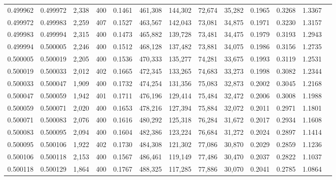 \begin{tabular}{rrrrrrrrrrrrr}
0.499962 & 0.499972 & 2,338 & 400 &                                     0.1461 & 461,308 & 144,302 &  72,674 &  35,282 & 0.1965 & 0.3268 & 1.3367 \\
0.499972 & 0.499983 & 2,259 & 407 &                                     0.1527 & 463,567 & 142,043 &  73,081 &  34,875 & 0.1971 & 0.3230 & 1.3157 \\
0.499983 & 0.499994 & 2,315 & 400 &                                     0.1473 & 465,882 & 139,728 &  73,481 &  34,475 & 0.1979 & 0.3193 & 1.2943 \\
0.499994 & 0.500005 & 2,246 & 400 &                                     0.1512 & 468,128 & 137,482 &  73,881 &  34,075 & 0.1986 & 0.3156 & 1.2735 \\
0.500005 & 0.500019 & 2,205 & 400 &                                     0.1536 & 470,333 & 135,277 &  74,281 &  33,675 & 0.1993 & 0.3119 & 1.2531 \\
0.500019 & 0.500033 & 2,012 & 402 &                                     0.1665 & 472,345 & 133,265 &  74,683 &  33,273 & 0.1998 & 0.3082 & 1.2344 \\
0.500033 & 0.500047 & 1,909 & 400 &                                     0.1732 & 474,254 & 131,356 &  75,083 &  32,873 & 0.2002 & 0.3045 & 1.2168 \\
0.500047 & 0.500059 & 1,942 & 401 &                                     0.1711 & 476,196 & 129,414 &  75,484 &  32,472 & 0.2006 & 0.3008 & 1.1988 \\
0.500059 & 0.500071 & 2,020 & 400 &                                     0.1653 & 478,216 & 127,394 &  75,884 &  32,072 & 0.2011 & 0.2971 & 1.1801 \\
0.500071 & 0.500083 & 2,076 & 400 &                                     0.1616 & 480,292 & 125,318 &  76,284 &  31,672 & 0.2017 & 0.2934 & 1.1608 \\
0.500083 & 0.500095 & 2,094 & 400 &                                     0.1604 & 482,386 & 123,224 &  76,684 &  31,272 & 0.2024 & 0.2897 & 1.1414 \\
0.500095 & 0.500106 & 1,922 & 402 &                                     0.1730 & 484,308 & 121,302 &  77,086 &  30,870 & 0.2029 & 0.2859 & 1.1236 \\
0.500106 & 0.500118 & 2,153 & 400 &                                     0.1567 & 486,461 & 119,149 &  77,486 &  30,470 & 0.2037 & 0.2822 & 1.1037 \\
0.500118 & 0.500129 & 1,864 & 400 &                                     0.1767 & 488,325 & 117,285 &  77,886 &  30,070 & 0.2041 & 0.2785 & 1.0864 \\

\end{tabular}
